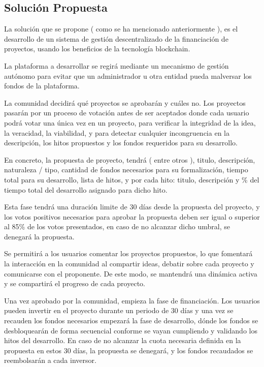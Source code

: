 \subsection{Solución Propuesta}

La solución que se propone ( como se ha mencionado anteriormente ), es el desarrollo de un sistema de gestión descentralizado de la financiación de proyectos, usando los beneficios de la tecnología blockchain.

\bigskip

La plataforma a desarrollar se regirá mediante un mecanismo de gestión autónomo para evitar que un administrador u otra entidad pueda malversar los fondos de la plataforma.

\bigskip

La comunidad decidirá qué proyectos se aprobarán y cuáles no. Los proyectos pasarán por un proceso de votación antes de ser aceptados donde cada usuario podrá votar una única vez en un proyecto, para verificar la integridad de la idea, la veracidad, la viabilidad, y para detectar cualquier incongruencia en la descripción, los hitos propuestos y los fondos requeridos para su desarrollo.

\bigskip

En concreto, la propuesta de proyecto, tendrá ( entre otros ), titulo, descripción, naturaleza / tipo, cantidad de fondos necesarios para su formalización, tiempo total para su desarrollo, lista de hitos, y por cada hito: titulo, descripción y \% del tiempo total del desarrollo asignado para dicho hito.

\bigskip

Esta fase tendrá una duración limite de 30 días desde la propuesta del proyecto, y los votos positivos necesarios para aprobar la propuesta deben ser igual o superior al 85\% de los votos presentados, en caso de no alcanzar dicho umbral, se denegará la propuesta.

\bigskip

Se permitirá a los usuarios comentar los proyectos propuestos, lo que fomentará la interacción en la comunidad al compartir ideas, debatir sobre cada proyecto y comunicarse con el proponente. De este modo, se mantendrá una dinámica activa y se compartirá el progreso de cada proyecto.

\bigskip

Una vez aprobado por la comunidad, empieza la fase de financiación. Los usuarios pueden invertir en el proyecto durante un periodo de 30 días y una vez se recauden los fondos necesarios empezará la fase de desarrollo, dónde los fondos se desbloquearán de forma secuencial conforme se vayan cumpliendo y validando los hitos del desarrollo. En caso de no alcanzar la cuota necesaria definida en la propuesta en estos 30 días, la propuesta se denegará, y los fondos recaudados se reembolsarán a cada inversor.

